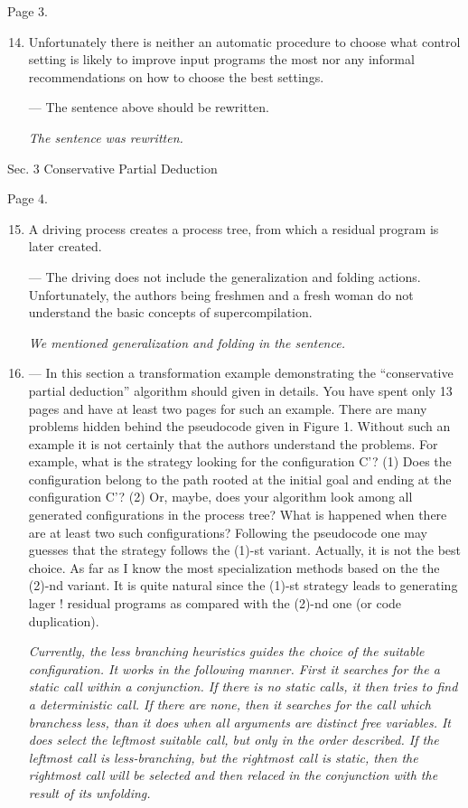 Page 3.

\begin{enumerate}
  \setcounter{enumi}{13}
  \item { Unfortunately there is neither an automatic procedure to choose what control setting is likely to improve input programs the most nor any informal recommendations on how to choose the best settings.

  --- The sentence above should be rewritten.

  \emph{The sentence was rewritten.}
  }
\end{enumerate}

Sec. 3 Conservative Partial Deduction

Page 4.

\begin{enumerate}
  \setcounter{enumi}{14}
  \item { A driving process creates a process tree, from which a residual program is later created.

  --- The driving does not include the generalization and folding actions. Unfortunately, the authors being freshmen and a fresh woman do not understand the basic concepts of supercompilation.

  \emph{We mentioned generalization and folding in the sentence.}}

  \item { --- In this section a transformation example demonstrating the ``conservative partial deduction'' algorithm should given in details. You have spent only 13 pages and have at least two pages for such an example.  There are many problems hidden behind the pseudocode given in Figure 1. Without such an example it is not certainly that the authors understand the problems. For example, what is the strategy looking for the configuration C'? (1) Does the configuration belong to the path rooted at the initial goal and ending at the configuration C'? (2) Or, maybe, does your algorithm look among all generated configurations in the process tree? What is happened when there are at least two such configurations? Following the pseudocode one may guesses that the strategy follows the (1)-st variant. Actually, it is not the best choice. As far as I know the most specialization methods based on the the (2)-nd variant. It is quite natural since the (1)-st strategy leads to generating lager !
  residual programs as compared with the (2)-nd one (or code duplication).

  \emph{Currently, the less branching heuristics guides the choice of the suitable configuration. It works in the following manner. First it searches for the a static call within a conjunction. If there is no static calls, it then tries to find a deterministic call. If there are none, then it searches for the call which branchess less, than it does when all arguments are distinct free variables. It does select the leftmost suitable call, but only in the order described. If the leftmost call is less-branching, but the rightmost call is static, then the rightmost call will be selected and then relaced in the conjunction with the result of its unfolding. }
  }


\end{enumerate}
